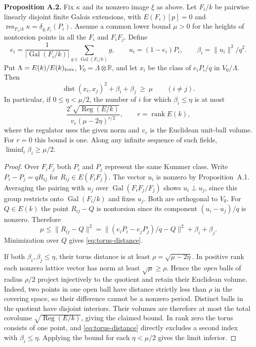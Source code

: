\documentclass[11pt]{article}
\begin{document}
\noindent\textbf{Proposition A.2.}
Fix $\kappa$ and its nonzero image $\xi$ as above. Let
$F_i/k$ be pairwise linearly disjoint finite Galois extensions,
with $E(F_i)[p]=0$ and $\operatorname{res}_{F_i/k}\kappa
=\delta_{q,F_i}(P_i)$. Assume a common lower bound $\mu>0$ for
the heights of nontorsion points in all the $F_i$ and $F_iF_j$.
Define
\[
 e_i=\frac1{|\operatorname{Gal}(F_i/k)|}
        \sum_{g\in\operatorname{Gal}(F_i/k)}g,\qquad
 u_i=(1-e_i)P_i,\qquad \beta_i=\|u_i\|^2/q^2.
\]
Put $\Lambda=E(k)/E(k)_{\rm tors}$, $V_0=\Lambda\otimes\mathbb R$,
and let $x_i$ be the class of $e_iP_i/q$ in $V_0/\Lambda$. Then
\begin{equation}\label{eq:torus-distance}
 \operatorname{dist}(x_i,x_j)^2+\beta_i+\beta_j\ \ge\ \mu
 \qquad (i\ne j).
\end{equation}
In particular, if $0\le\eta<\mu/2$, the number of $i$
for which $\beta_i\le\eta$ is at most
\[
 \frac{2^r\sqrt{\operatorname{Reg}(E/k)}}
 {v_r(\mu-2\eta)^{r/2}},
 \qquad r=\operatorname{rank}E(k),
\]
where the regulator uses the given norm and $v_r$ is the Euclidean
unit-ball volume. For $r=0$ this bound is one. Along any infinite
sequence of such fields, $\liminf_i\beta_i\ge\mu/2$.

\begin{proof}
Over $F_iF_j$ both $P_i$ and $P_j$ represent the same Kummer class.
Write $P_i-P_j=qR_{ij}$ for $R_{ij}\in E(F_iF_j)$. The vector
$u_i$ is nonzero by Proposition~A.1. Averaging the pairing with $u_j$
over $\operatorname{Gal}(F_iF_j/F_j)$ shows $u_i\perp u_j$,
since this group restricts onto $\operatorname{Gal}(F_i/k)$ and
fixes $u_j$. Both are orthogonal to $V_0$. For $Q\in E(k)$ the point
$R_{ij}-Q$ is nontorsion since its component $(u_i-u_j)/q$ is nonzero.
Therefore
\[
 \mu\le \|R_{ij}-Q\|^2
 =\|(e_iP_i-e_jP_j)/q-Q\|^2+\beta_i+\beta_j.
\]
Minimization over $Q$ gives \eqref{eq:torus-distance}.

If both $\beta_i,\beta_j\le\eta$, their torus distance is at least
$\rho=\sqrt{\mu-2\eta}$. In positive rank each nonzero lattice
vector has norm at least $\sqrt{\mu}\ge\rho$. Hence the
\emph{open} balls of radius $\rho/2$ project injectively to the quotient and retain their Euclidean volume.
Indeed, two points in one open
ball have distance strictly less than $\rho$ in the covering space,
so their difference cannot be a nonzero period. Distinct balls in
the quotient have disjoint interiors. Their volumes are therefore
at most the total covolume $\sqrt{\operatorname{Reg}(E/k)}$, giving
the claimed bound. In rank zero the torus consists of one point,
and \eqref{eq:torus-distance} directly excludes a second index with
$\beta_i\le\eta$. Applying the bound for each $\eta<\mu/2$ gives
the limit inferior.
\end{proof}
\end{document}
